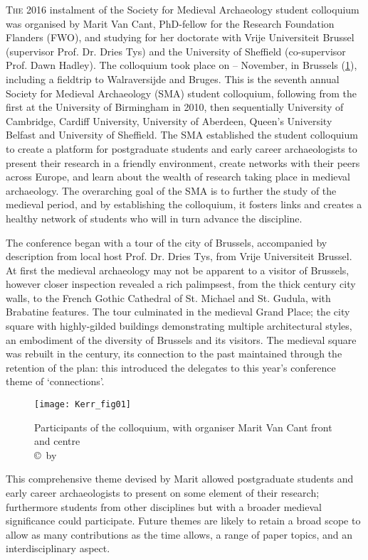 \documentclass[%
	]{ijsra}
\begin{document}
\IJSRAopening%
\lettrine{T}{he} 2016 instalment of the Society for Medieval Archaeology student colloquium was organised by Marit Van Cant, PhD-fellow for the Research Foundation Flanders (FWO), and studying for her doctorate with Vrije Universiteit Brussel (supervisor Prof. Dr. Dries Tys) and the University of Sheffield (co-supervisor Prof. Dawn Hadley). 
The colloquium took place on – November, in Brussels (\cref{fig:Kerr_fig01}), including a fieldtrip to Walraversijde and Bruges. This is the seventh annual Society for Medieval Archaeology (SMA) student colloquium, following from the first at the University of Birmingham in 2010, then sequentially University of Cambridge, Cardiff University, University of Aberdeen, Queen’s University Belfast and University of Sheffield. The SMA established the student colloquium to create a platform for postgraduate students and early career archaeologists to present their research in a friendly environment, create networks with their peers across Europe, and learn about the wealth of research taking place in medieval archaeology. The overarching goal of the SMA is to further the study of the medieval period, and by establishing the colloquium, it fosters links and creates a healthy network of students who will in turn advance the discipline.

The conference began with a tour of the city of Brussels, accompanied by description from local host Prof. Dr. Dries Tys, from Vrije Universiteit Brussel. At first the medieval archaeology may not be apparent to a visitor of Brussels, however closer inspection revealed a rich palimpsest, from the thick  century city walls, to the French Gothic Cathedral of St. Michael and St. Gudula, with Brabatine features. The tour culminated in the medieval Grand Place; the city square with highly-gilded buildings demonstrating multiple architectural styles, an embodiment of the diversity of Brussels and its visitors. The medieval square was rebuilt in the  century, its connection to the past maintained through the retention of the plan: this introduced the delegates to this year’s conference theme of ‘connections’. 

\begin{figure}[!tb]
\texttt{[image: Kerr\_fig01]}
\caption{Participants of the colloquium, with organiser Marit Van Cant front and centre
        {\normalfont\scriptsize \\ \copyright\ by 
                 \shortauthor
                  }}
\label{fig:Kerr_fig01}
\end{figure}
This comprehensive theme devised by Marit allowed postgraduate students and early career archaeologists to present on some element of their research; furthermore students from other disciplines but with a broader medieval significance could participate. Future themes are likely to retain a broad scope to allow as many contributions as the time allows, a range of paper topics, and an interdisciplinary aspect. 
\end{document}
